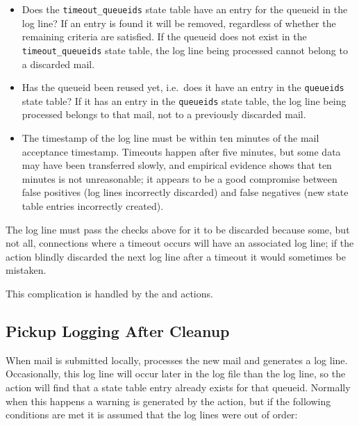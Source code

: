 \begin{itemize}

    \item Does the \texttt{timeout\_queueids} state table have an entry for
        the queueid in the log line?  If an entry is found it will be
        removed, regardless of whether the remaining criteria are
        satisfied.  If the queueid does not exist in the
        \texttt{timeout\_queueids} state table, the log line being
        processed cannot belong to a discarded mail.

    \item Has the queueid been reused yet, i.e.\ does it have an entry in
        the \texttt{queueids} state table?  If it has an entry in the
        \texttt{queueids} state table, the log line being processed belongs
        to that mail, not to a previously discarded mail.

    \item The timestamp of the  log line must be within ten
        minutes of the mail acceptance timestamp.  Timeouts happen after
        five minutes, but some data may have been transferred slowly, and
        empirical evidence shows that ten minutes is not unreasonable; it
        appears to be a good compromise between false positives (log lines
        incorrectly discarded) and false negatives (new state table entries
        incorrectly created).

\end{itemize}

The  log line must pass the checks above for it to be
discarded because some, but not all, connections where a timeout occurs
will have an associated  log line; if the
 action blindly discarded the next
 log line after a timeout it would sometimes be mistaken.

This complication is handled by the  and
 actions.

\subsection{Pickup Logging After Cleanup}

\label{pickup logging after cleanup}

When mail is submitted locally,  processes the new mail and
generates a log line.  Occasionally, this log line will occur later in the
log file than the  log line, so the  action
will find that a state table entry already exists for that queueid.
Normally when this happens a warning is generated by the 
action, but if the following conditions are met it is assumed that the log
lines were out of order:

